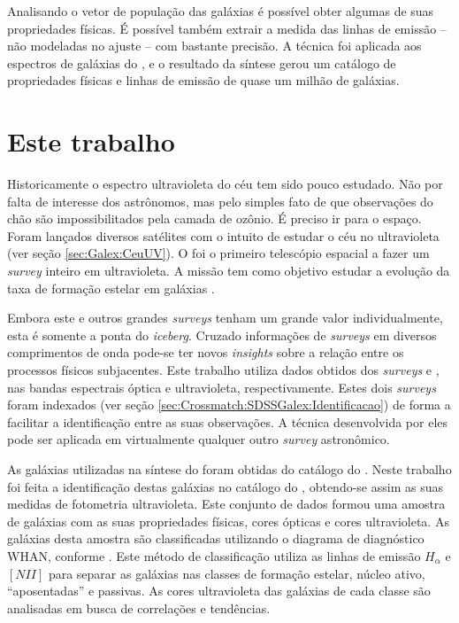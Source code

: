 Analisando o vetor de população das galáxias é possível obter algumas de suas
propriedades físicas. É possível também extrair a medida das linhas de emissão
-- não modeladas no ajuste -- com bastante precisão. A técnica foi aplicada aos
espectros de galáxias do \SDSS, e o resultado da síntese gerou um catálogo de
propriedades físicas e linhas de emissão de quase um milhão de galáxias.



\section{Este trabalho}
\label{sec:Intro:EsteTrab}

Historicamente o espectro ultravioleta do céu tem sido pouco estudado. Não por
falta de interesse dos astrônomos, mas pelo simples fato de que observações do
chão são impossibilitados pela camada de ozônio. É preciso ir para o espaço.
Foram lançados diversos satélites com o intuito de estudar o céu no ultravioleta
(ver seção \ref{sec:Galex:CeuUV}). O \galex foi o primeiro telescópio espacial a
fazer um {\em survey} inteiro em ultravioleta. A missão tem como objetivo
estudar a evolução da taxa de formação estelar em galáxias \citep{Martin2005}.

Embora este e outros grandes {\em surveys} tenham um grande valor
individualmente, esta é somente a ponta do {\em iceberg}. Cruzado informações de
{\em surveys} em diversos comprimentos de onda pode-se ter novos {\em insights}
sobre a relação entre os processos físicos subjacentes. Este trabalho utiliza
dados obtidos dos {\em surveys} \SDSS e \galex, nas bandas espectrais óptica e
ultravioleta, respectivamente. Estes dois {\em surveys} foram indexados (ver
seção \ref{sec:Crossmatch:SDSSGalex:Identificacao}) de forma a facilitar a
identificação entre as suas observações. A técnica desenvolvida por eles pode
ser aplicada em virtualmente qualquer outro {\em survey} astronômico.

As galáxias utilizadas na síntese do \starlight foram obtidas do catálogo do
\SDSS. Neste trabalho foi feita a identificação destas galáxias no catálogo do
\galex, obtendo-se assim as suas medidas de fotometria ultravioleta. Este
conjunto de dados formou uma amostra de galáxias com as suas propriedades
físicas, cores ópticas e cores ultravioleta. As galáxias desta amostra são
classificadas utilizando o diagrama de diagnóstico WHAN, conforme
\citet{CidFernandes2011}. Este método de classificação utiliza as linhas de
emissão $H_\alpha$ e $[NII]$ para separar as galáxias nas classes de formação
estelar, núcleo ativo, ``aposentadas'' e passivas. As cores ultravioleta das
galáxias de cada classe são analisadas em busca de correlações e tendências.

